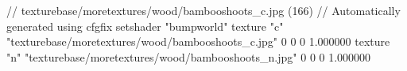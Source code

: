 // texturebase/moretextures/wood/bambooshoots_c.jpg (166)
// Automatically generated using cfgfix
setshader "bumpworld"
texture "c" "texturebase/moretextures/wood/bambooshoots_c.jpg" 0 0 0 1.000000
texture "n" "texturebase/moretextures/wood/bambooshoots_n.jpg" 0 0 0 1.000000
